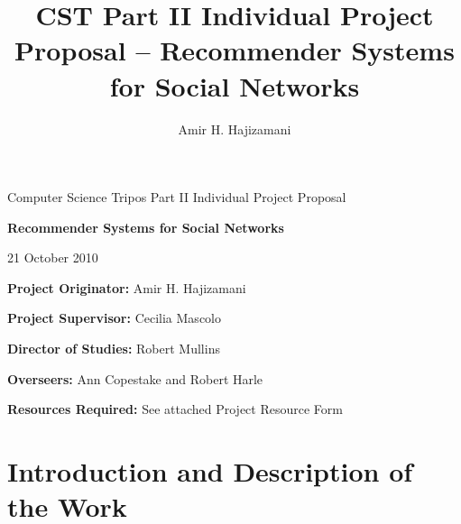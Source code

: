 
\author{Amir H. Hajizamani}
\title{CST Part II Individual Project Proposal -- Recommender Systems for Social Networks}

\newcommand{\al}{$<$}
\newcommand{\ar}{$>$}

\parindent 0pt
\parskip 6pt

\thispagestyle{empty}

\medskip
{}
\medskip
{}

\vfill

\centerline{\large Computer Science Tripos Part II Individual Project Proposal}
\vspace{0.4in}
\centerline{\Large\bf Recommender Systems for Social Networks}
\vspace{0.3in}
\centerline{\large{21 October 2010}}

\vfill

{\bf Project Originator:} Amir H. Hajizamani

\vspace{0.2in}

{\bf Project Supervisor:} Cecilia Mascolo



\vspace{0.5in}

{\bf Director of Studies:} Robert Mullins

\vspace{0.2in}



{\bf Overseers:} Ann Copestake and Robert Harle



\vspace{0.5in}

{\bf Resources Required:} See attached Project Resource Form

\vfill
\eject


\section{Introduction and Description of the Work}

